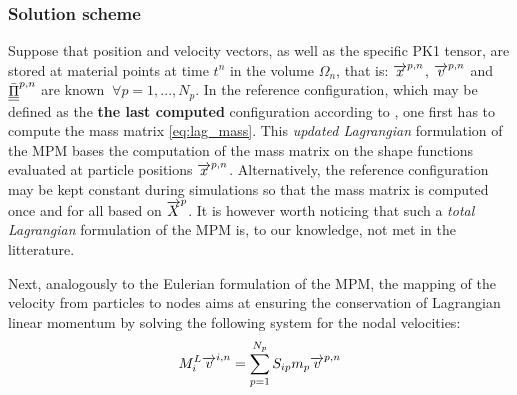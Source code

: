\subsubsection*{Solution scheme}
Suppose that position and velocity vectors, as well as the specific PK1 tensor, are stored at material points at time $t^n$ in the volume $\Omega_n$, that is: ${\overrightarrow{x}}^{p,n}$, ${\overrightarrow{v}}^{p,n}$ and ${\underline{\underline{\bar{\Pi}}}}^{p,n}$ are known $\: \forall p=1,...,N_p$.
In the reference configuration, which may be defined as the \textbf{the last computed} configuration according to \cite{Love}, one first has to compute the mass matrix \eqref{eq:lag_mass}.
This \textit{updated Lagrangian} formulation of the MPM bases the computation of the mass matrix on the shape functions evaluated at particle positions ${\overrightarrow{x}}^{p,n}$.
Alternatively, the reference configuration may be kept constant during simulations so that the mass matrix is computed once and for all based on ${\overrightarrow{X}}^{p}$. It is however worth noticing that such a \textit{total Lagrangian} formulation of the MPM is, to our knowledge, not met in the litterature.

Next, analogously to the Eulerian formulation of the MPM, the mapping of the velocity from particles to nodes aims at ensuring the conservation of Lagrangian linear momentum by solving the following system for the nodal velocities:
\begin{equation*}
  M^{L}_i {\overrightarrow{v}}^{i,n} = \sum_{p=1}^{N_p} S_{ip}m_p {\overrightarrow{v}}^{p,n}
\end{equation*}

